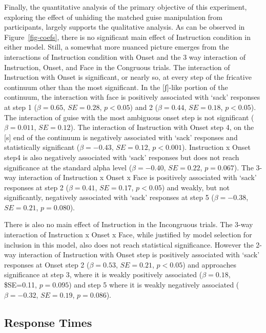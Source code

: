 \documentclass[
  letterpaper,
  DIV=11,
  numbers=noendperiod]{scrartcl}
\begin{document}
Finally, the quantitative analysis of the primary objective of this
experiment, exploring the effect of unhiding the matched guise
manipulation from participants, largely supports the qualitative
analysis. As can be observed in Figure~\ref{fig-coefs}, there is no
significant main effect of Instruction condition in either model. Still,
a somewhat more nuanced picture emerges from the interactions of
Instruction condition with Onset and the 3 way interaction of
Instruction, Onset, and Face in the Congruous trials. The interaction of
Instruction with Onset is significant, or nearly so, at every step of
the fricative continuum other than the most significant. In the
{[}ʃ{]}-like portion of the continuum, the interaction with face is
positively associated with `sack' responses at step 1 (\(β=0.65\),
\(SE=0.28\), \(p < 0.05\)) and 2 (\(β=0.44\), \(SE=0.18\),
\(p < 0.05\)). The interaction of guise with the most ambiguous onset
step is not significant (\(β=0.011\), \(SE=0.12\)). The interaction of
Instruction with Onset step 4, on the {[}s{]} end of the continuum is
negatively associated with `sack' responses and statistically
significant (\(β=-0.43\), \(SE=0.12\), \(p < 0.001\)). Instruction x
Onset step4 is also negatively associated with `sack' responses but does
not reach significance at the standard alpha level (\(β=-0.40\),
\(SE=0.22\), \(p = 0.067\)). The 3-way interaction of Instruction x
Onset x Face is positively associated with `sack' responses at step 2
(\(β=0.41\), \(SE=0.17\), \(p < 0.05\)) and weakly, but not
significantly, negatively associated with `sack' responses at step 5
(\(β=-0.38\), \(SE=0.21\), \(p = 0.080\)).

There is also no main effect of Instruction in the Incongruous trials.
The 3-way interaction of Instruction x Onset x Face, while justified by
model selection for inclusion in this model, also does not reach
statistical significance. However the 2-way interaction of Instruction
with Onset step is positively associated with `sack' responses at Onset
step 2 (\(β=0.53\), \(SE=0.21\), \(p < 0.05\)) and approaches
significance at step 3, where it is weakly positively associated
(\(β=0.18\), \$SE=0.11, \(p = 0.095\)) and step 5 where it is weakly
negatively associated (\(β=-0.32\), \(SE=0.19\), \(p = 0.086\)).

\subsection{Response Times}\label{sub-results-rt}
\end{document}
